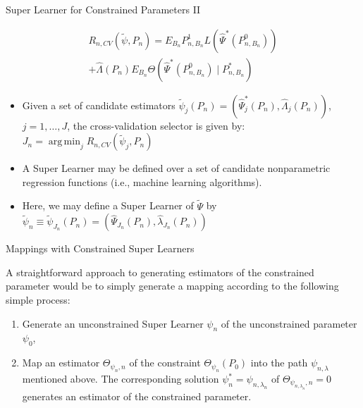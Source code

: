\documentclass[12pt,t]{beamer}
\DeclareMathOperator*{\argmin}{arg\,min}
\begin{document}

\begin{frame}[c]{Super Learner for Constrained Parameters II}

\begin{center}
\begin{equation}
\begin{split}
  R_{n, CV}(\tilde{\psi}, P_n) = E_{B_n}P_{n, B_n}^1L(\hat{\Psi}^*(P_{n,
    B_n}^0)) \\ + \hat{\Lambda}(P_n) E_{B_n} \Theta(\hat{\Psi}^*(P_{n, B_n}^0)
    \mid P_{n, B_n}^*)
\end{split}
\end{equation}
\begin{itemize}
  \itemsep12pt
  \item Given a set of candidate estimators $\widetilde{\psi}_j(P_n) =
    (\hat{\Psi}_j^*(P_n), \hat{\Lambda}_j(P_n))$, $j = 1, \ldots, J$, the
    cross-validation selector is given by: $J_n = \argmin_j R_{n,
      CV}(\widetilde{\psi}_j, P_n)$
  \item A Super Learner may be defined over a set of candidate nonparametric
    regression functions (i.e., machine learning algorithms).
  \item Here, we may define a Super Learner of $\widetilde{\Psi}$ by
    $\widetilde{\psi}_n \equiv \widetilde{\psi}_{J_n}(P_n) =
    (\hat{\Psi}_{J_n}(P_n), \hat{\lambda}_{J_n}(P_n))$
\end{itemize}
\end{center}

\note{
}

\end{frame}


\begin{frame}[c]{Mappings with Constrained Super Learners}

\begin{center}
A straightforward approach to generating estimators of the constrained parameter
would be to simply generate a mapping according to the following simple process:

\vspace*{1em}

\begin{enumerate}
  \itemsep12pt
  \item Generate an unconstrained Super Learner $\psi_n$ of the unconstrained
    parameter $\psi_0$,
  \item Map an estimator $\Theta_{\psi_n, n}$ of the constraint
    $\Theta_{\psi_n}(P_0)$ into the path $\psi_{n, \lambda}$ mentioned above.
    The corresponding solution $\psi_n^* = \psi_{n, \lambda_n}$ of
    $\Theta_{\psi_{n, \lambda_n}, n}= 0$ generates an estimator of the
    constrained parameter.
\end{enumerate}
\end{center}

\note{
}

\end{frame}
\end{document}
